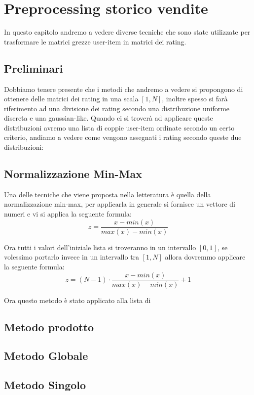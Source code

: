 
\hypertarget{(chap:capitolo5)}{}
\chapter{Preprocessing storico vendite}
In questo capitolo andremo a vedere diverse tecniche che sono state utilizzate per trasformare le matrici grezze user-item in matrici dei rating.\\

\section{Preliminari}
Dobbiamo tenere presente che i metodi che andremo a vedere si propongono di ottenere delle matrici dei rating in una scala $[1,N]$, inoltre spesso si farà riferimento ad una divisione dei rating secondo una distribuzione uniforme discreta e una gaussian-like. Quando ci si troverà ad applicare queste distribuzioni avremo una lista di coppie user-item ordinate secondo un certo criterio, andiamo a vedere come vengono assegnati i rating secondo queste due distribuzioni:
\

\section{Normalizzazione Min-Max}
Una delle tecniche che viene proposta nella letteratura è quella della normalizzazione min-max, per applicarla in generale si fornisce un vettore di numeri e vi si applica la seguente formula:
$$z = \frac{x - min(x)}{max(x) - min(x)}$$

Ora tutti i valori dell'iniziale lista si troveranno in un intervallo $[0,1]$, se volessimo portarlo invece in un intervallo tra $[1,N]$ allora dovremmo applicare la seguente formula:
$$z = (N -1) \cdot \frac{x - min(x)}{max(x) - min(x)} + 1$$

Ora questo metodo è stato applicato alla lista di 


\section{Metodo prodotto}

\section{Metodo Globale}

\section{Metodo Singolo}